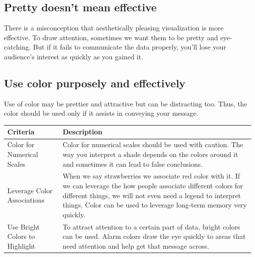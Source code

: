 \documentclass[]{book}
\theoremstyle{definition}
\theoremstyle{definition}
\theoremstyle{definition}
\theoremstyle{remark}
\begin{document}
\subsection{Pretty doesn't mean
effective}\label{pretty-doesnt-mean-effective}

There is a misconception that aesthetically pleasing visualization is
more effective. To draw attention, sometimes we want them to be pretty
and eye-catching. But if it fails to communicate the data properly,
you'll lose your audience's interest as quickly as you gained it.

\subsection{Use color purposely and
effectively}\label{use-color-purposely-and-effectively}

Use of color may be prettier and attractive but can be distracting too.
Thus, the color should be used only if it assists in conveying your
message.

\begin{longtable}[]{@{}ll@{}}
\toprule
\begin{minipage}[b]{0.18\columnwidth}\raggedright\strut
\textbf{Criteria}\strut
\end{minipage} & \begin{minipage}[b]{0.68\columnwidth}\raggedright\strut
\textbf{Description}\strut
\end{minipage}\tabularnewline
\midrule
\endhead
\begin{minipage}[t]{0.18\columnwidth}\raggedright\strut
Color for Numerical Scales\strut
\end{minipage} & \begin{minipage}[t]{0.68\columnwidth}\raggedright\strut
Color for numerical scales should be used with caution. The way you
interpret a shade depends on the colors around it and sometimes it can
lead to false conclusions.\strut
\end{minipage}\tabularnewline
\begin{minipage}[t]{0.18\columnwidth}\raggedright\strut
Leverage Color Associations\strut
\end{minipage} & \begin{minipage}[t]{0.68\columnwidth}\raggedright\strut
When we say strawberries we associate red color with it. If we can
leverage the how people associate different colors for different things,
we will not even need a legend to interpret things. Color can be used to
leverage long-term memory very quickly.\strut
\end{minipage}\tabularnewline
\begin{minipage}[t]{0.18\columnwidth}\raggedright\strut
Use Bright Colors to Highlight\strut
\end{minipage} & \begin{minipage}[t]{0.68\columnwidth}\raggedright\strut
To attract attention to a certain part of data, bright colors can be
used. Alarm colors draw the eye quickly to areas that need attention and
help get that message across.\strut
\end{minipage}\tabularnewline
\bottomrule
\end{longtable}
\end{document}
